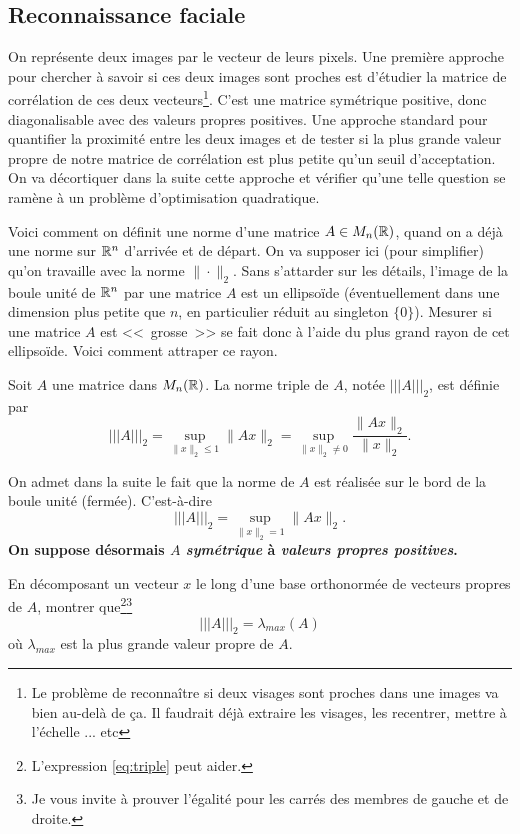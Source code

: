 \documentclass[11pt, a4paper]{article}
\begin{document}
\subsection{Reconnaissance faciale}

On représente deux images par le vecteur de leurs pixels. Une première
approche pour chercher à savoir si ces deux images sont proches est
d'étudier la matrice de corrélation de ces deux vecteurs\footnote{Le
  problème de reconnaître si deux visages sont proches dans une images
  va bien au-delà de \c{c}a. Il faudrait déjà extraire les visages,
  les recentrer, mettre à l'échelle ... etc}. C'est une matrice
symétrique positive, donc diagonalisable avec des valeurs propres
positives. Une approche standard pour quantifier la proximité entre
les deux images et de tester si la plus grande valeur propre de notre
matrice de corrélation est plus petite qu'un seuil d'acceptation. On
va décortiquer dans la suite cette approche et vérifier qu'une telle
question se ramène à un problème d'optimisation quadratique.

Voici comment on définit une norme d'une matrice $A \in M_n(\mathbb{R})$,
quand on a déjà une norme sur $\mathbb{R}^n$ d'arrivée et de départ. On va
supposer ici (pour simplifier) qu'on travaille avec la norme
$\|\cdot \|_2$. Sans s'attarder sur les détails, l'image de la boule
unité de $\mathbb{R}^n$ par une matrice $A$ est un ellipsoïde (éventuellement
dans une dimension plus petite que $n$, en particulier réduit au
singleton $\{0\}$). Mesurer si une matrice $A$ est <<\, grosse \,>> se fait
donc à l'aide du plus grand rayon de cet ellipsoïde. Voici comment
attraper ce rayon.
\begin{defn}
  Soit $A$ une matrice dans $M_n(\mathbb{R})$. La norme triple de $A$, notée
  $|||A|||_2$, est définie par
  \[
  |||A|||_2 = \sup_{\|x\|_2 \leq 1} \|Ax\|_2 = \sup_{\|x\|_2 \neq 0} \frac{\|Ax\|_2}{\|x\|_2}.
  \]
\end{defn}
\noindent On admet dans la suite le fait que la norme de $A$ est réalisée sur le
bord de la boule unité (fermée). C'est-à-dire
\begin{equation}
  \label{eq:triple}
  |||A|||_2 = \sup_{\|x\|_2 = 1} \|Ax\|_2.
\end{equation}
\textbf{On suppose désormais $A$ \emph{symétrique} à \emph{valeurs propres
  positives}.}
\begin{question}
  \label{qu:lambdatriple}
  En décomposant un vecteur $x$ le long d'une base orthonormée de
  vecteurs propres de $A$, montrer que\footnote{L'expression
    \eqref{eq:triple} peut aider.}\footnote{Je vous invite à prouver l'égalité
    pour les carrés des membres de gauche et de droite.}
  \[
  |||A|||_2 = \lambda_{max}(A)
  \]
  où $\lambda_{max}$ est la plus grande valeur propre de $A$. 
\end{question}
\end{document}

